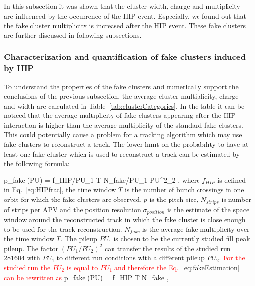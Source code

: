In this subsection it was shown that the cluster width, charge and multiplicity are influenced by the occurrence of the HIP event. Especially, we found out that the fake cluster multiplicity is increased after the HIP event. These fake clusters are further discussed in following subsections.


\subsubsection{Characterization and quantification of fake clusters induced by HIP~\label{sec:fakes}}

To understand the properties of the fake clusters and numerically support the conclusions of the previous subsection, the average cluster multiplicity, charge and width are calculated in Table~\ref{tab:clusterCategories}. In the table it can be noticed that the average multiplicity of fake clusters appearing after the HIP interaction is higher than the average multiplicity of the standard fake clusters. This could potentially cause a problem for a tracking algorithm which may use fake clusters to reconstruct a track. The lower limit on the probability to have at least one fake cluster which is used to reconstruct a track can be estimated by the following formula:


{
   p_{fake} (PU) = f_{HIP}/PU_{1} \times T  \times N_{fake}/PU_{1} \times PU^2_{2} \times  {}  ,
}
where $f_{HIP}$ is defined in Eq.~\ref{eq:HIPfrac}, the time window $T$ is the number of bunch crossings in one orbit for which the fake clusters are observed, $p$ is the pitch size, $N_{strips}$ is number of strips per APV and the position resolution $\sigma_{position}$ is the estimate of the space window around the reconstructed track in which the fake cluster is close enough to be used for the track reconstruction. $N_{fake}$ is the average fake multiplicity over the time window $T$. The pileup $PU_{1}$ is chosen to be the currently studied fill peak pileup. The factor $(PU_{1}/PU_{2})^2$ can transfer the results of the studied run 281604 with $PU_{1}$ to different run conditions with a different pileup $PU_{2}$. \textcolor{red}{For the studied run the  $PU_{2}$ is equal to $PU_{1}$ and therefore the Eq.~\ref{eq:fakeEstimation} can be rewritten as}
{
   p_{fake} (PU) = f_{HIP} \times T  \times N_{fake}  \times  {}  ,
}



